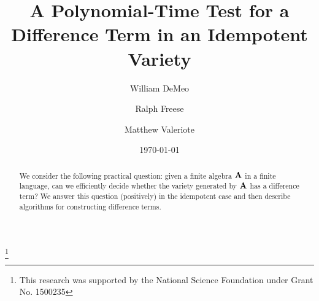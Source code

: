 

\title[A Test for a Difference Term]{A Polynomial-Time Test for a
Difference Term in an Idempotent Variety}
\author[W.~DeMeo]{William DeMeo}
\address{University of Colorado\\Mathematics Dept\\Boulder 80309\\USA}

\author[R.~Freese]{Ralph Freese}
\address{University of Hawaii\\Mathematics Dept\\Honolulu 96822\\USA}
\author[M.~Valeriote]{Matthew Valeriote}
\address{McMaster University\\Mathematics Dept\\Hamilton L8S 4K1\\
CAN}

\thanks{This research was supported by the National
Science Foundation under Grant No. 1500235}

\date{\today}



\maketitle

\begin{abstract}
We consider the following practical question: given a finite
algebra $\mathbf{A}$ in a
finite language, can we efficiently decide whether the variety
generated by $\mathbf{A}$
has a difference term?  We answer this question (positively) in the
idempotent case and then describe algorithms for constructing difference
terms.
\end{abstract}

